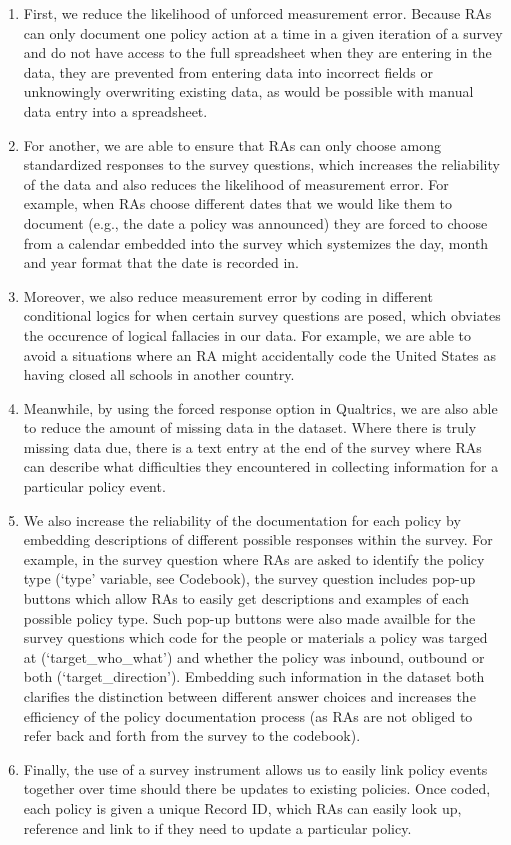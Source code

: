 \documentclass[]{article}
\begin{document}
\begin{enumerate}
\def\labelenumi{\arabic{enumi}.}
\item
  First, we reduce the likelihood of unforced measurement error. Because RAs can only document one policy action at a time in a given iteration of a survey and do not have access to the full spreadsheet when they are entering in the data, they are prevented from entering data into incorrect fields or unknowingly overwriting existing data, as would be possible with manual data entry into a spreadsheet.
\item
  For another, we are able to ensure that RAs can only choose among standardized responses to the survey questions, which increases the reliability of the data and also reduces the likelihood of measurement error. For example, when RAs choose different dates that we would like them to document (e.g., the date a policy was announced) they are forced to choose from a calendar embedded into the survey which systemizes the day, month and year format that the date is recorded in.
\item
  Moreover, we also reduce measurement error by coding in different conditional logics for when certain survey questions are posed, which obviates the occurence of logical fallacies in our data. For example, we are able to avoid a situations where an RA might accidentally code the United States as having closed all schools in another country.
\item
  Meanwhile, by using the forced response option in Qualtrics, we are also able to reduce the amount of missing data in the dataset. Where there is truly missing data due, there is a text entry at the end of the survey where RAs can describe what difficulties they encountered in collecting information for a particular policy event.
\item
  We also increase the reliability of the documentation for each policy by embedding descriptions of different possible responses within the survey. For example, in the survey question where RAs are asked to identify the policy type (`type' variable, see Codebook), the survey question includes pop-up buttons which allow RAs to easily get descriptions and examples of each possible policy type. Such pop-up buttons were also made availble for the survey questions which code for the people or materials a policy was targed at (`target\_who\_what') and whether the policy was inbound, outbound or both (`target\_direction'). Embedding such information in the dataset both clarifies the distinction between different answer choices and increases the efficiency of the policy documentation process (as RAs are not obliged to refer back and forth from the survey to the codebook).
\item
  Finally, the use of a survey instrument allows us to easily link policy events together over time should there be updates to existing policies. Once coded, each policy is given a unique Record ID, which RAs can easily look up, reference and link to if they need to update a particular policy.
\end{enumerate}
\end{document}
